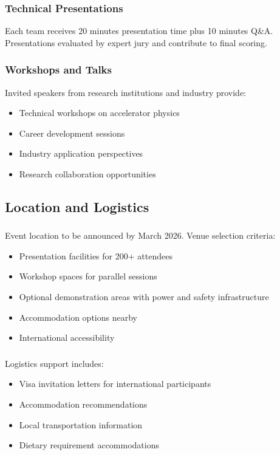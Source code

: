 \subsubsection{Technical Presentations}
Each team receives 20 minutes presentation time plus 10 minutes Q\&A. Presentations evaluated by expert jury and contribute to final scoring.

\subsubsection{Workshops and Talks}
Invited speakers from research institutions and industry provide:
\begin{itemize}[noitemsep]
    \item Technical workshops on accelerator physics
    \item Career development sessions
    \item Industry application perspectives
    \item Research collaboration opportunities
\end{itemize}

\subsection{Location and Logistics}

\subsubsection{}
Event location to be announced by March 2026. Venue selection criteria:
\begin{itemize}[noitemsep]
    \item Presentation facilities for 200+ attendees
    \item Workshop spaces for parallel sessions
    \item Optional demonstration areas with power and safety infrastructure
    \item Accommodation options nearby
    \item International accessibility
\end{itemize}

\subsubsection{}
Logistics support includes:
\begin{itemize}[noitemsep]
    \item Visa invitation letters for international participants
    \item Accommodation recommendations
    \item Local transportation information
    \item Dietary requirement accommodations
\end{itemize}

